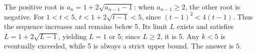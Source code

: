 The positive root is $ a_n=1+2\sqrt{a_{n-1}-1}$: when $ a_{n-1}\ge2 $, the other root is negative. For $ 1<t<5 $, $ t<1+2\sqrt{t-1}<5 $, since $(t-1)^2<4(t-1)$. Thus the sequence increases and remains below 5. Its limit $ L $ exists and satisfies $ L=1+2\sqrt{L-1}$, yielding $ L=1 $ or 5; since $ L\ge2 $, it is 5. Any $ k<5 $ is eventually exceeded, while 5 is always a strict upper bound. The answer is $\boxed5 $.
